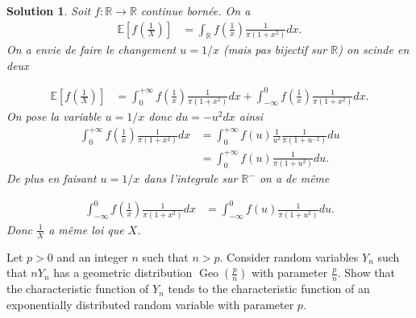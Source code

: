 \documentclass{article}
\newtheorem{solution}{Solution}
\begin{document}
\begin{solution}
  Soit $f:\mathbb R\longrightarrow \mathbb R$ continue born\'ee. On a
  \begin{align*}
    \mathbb E[f(\frac1X)] & =\int_\mathbb R f(\frac1x) \frac{1}{\pi(1+x^2)} dx.
  \end{align*}
  On a envie de faire le changement $u=1/x$ (mais pas bijectif sur $\mathbb R$) on scinde en deux

  \begin{align*}
    \mathbb E[f(\frac1X)] & =\int_0^{+\infty} f(\frac1x) \frac{1}{\pi(1+x^2)} dx+ \int_{-\infty}^0 f(\frac1x) \frac{1}{\pi(1+x^2)} dx.
  \end{align*}
  On pose la variable $u=1/x$ donc $du=-u^2 dx$ ainsi
  \begin{align*}
    \int_0^{+\infty} f(\frac1x) \frac{1}{\pi(1+x^2)} dx & =\int_0^{+\infty} f(u)\frac{1}{u^2}  \frac{1}{\pi(1+u^{-2})} du \\
                                                        & =\int_0^{+\infty} f(u) \frac{1}{\pi(1+u^2)} du.
  \end{align*}
  De plus en faisant $u=1/x$ dans l'integrale sur $\mathbb R^-$ on a de m\^eme

  \begin{align*}
    \int_{-\infty}^0 f(\frac1x) \frac{1}{\pi(1+x^2)} dx & =\int_{-\infty}^0 f(u) \frac{1}{\pi(1+u^2)} du.
  \end{align*}
  Donc $\frac1X$ a m\^eme loi que $X$.
\end{solution}

\begin{Exercise}
  Let $p>0$ and an integer $n$ such that $n>p$. Consider random variables $Y_{n}$ such that $n Y_{n}$ has a geometric distribution $\operatorname{Geo}\left(\frac{p}{n}\right)$ with parameter $\frac{p}{n}$. Show that the characteristic function of $Y_{n}$ tends to the characteristic function of an exponentially distributed random variable with parameter $p$.
\end{Exercise}
\end{document}
